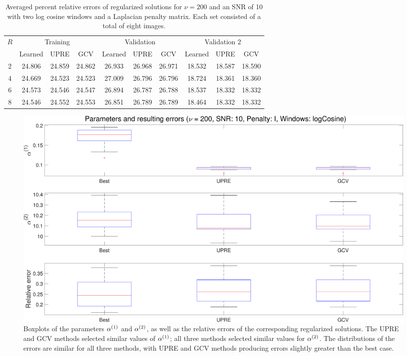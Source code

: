 \documentclass[12pt]{article}
\begin{document}
\begin{table}[ht!]
  \begin{center}
    \caption{Averaged percent relative errors of regularized solutions for $\nu = 200$ and an SNR of 10 with two log cosine windows and a Laplacian penalty matrix. Each set consisted of a total of eight images.}
    \label{tab:Relative Errors v200_SNR10_logCos2_L}
    \begin{tabular}{|c|c|c|c|c|c|c|c|c|c|}
    \hline
    \multirow{2}{*}{$R$} & \multicolumn{3}{|c|}{Training} & \multicolumn{3}{|c|}{Validation} & \multicolumn{3}{|c|}{Validation 2} \\
    \cline{2-10}
     & Learned & UPRE & GCV & Learned & UPRE & GCV & Learned & UPRE & GCV \\
    \hline
    2 & 24.806 & 24.859 & 24.862 & 26.933 & 26.968 & 26.971 & 18.532 & 18.587 & 18.590 \\
    \hline
    4 & 24.669 & 24.523 & 24.523 & 27.009 & 26.796 & 26.796 & 18.724 & 18.361 & 18.360\\
    \hline
    6 & 24.573 & 24.546 & 24.547 & 26.894 & 26.787 & 26.788 & 18.537 & 18.332 & 18.332 \\
    \hline
    8 & 24.546 & 24.552 & 24.553 & 26.851 & 26.789 & 26.789 & 18.464 & 18.332 & 18.332\\
    \hline
    \end{tabular}
  \end{center}
\end{table}


\begin{figure}[ht]
\centering
\includegraphics[width=1.0\textwidth]{Figures/Boxplot_v200_SNR10_logCos2_I.pdf}
\caption{Boxplots of the parameters $\alpha^{(1)}$ and $\alpha^{(2)}$, as well as the relative errors of the corresponding regularized solutions. The UPRE and GCV methods selected similar values of $\alpha^{(1)}$; all three methods selected similar values for $\alpha^{(2)}$. The distributions of the errors are similar for all three methods, with UPRE and GCV methods producing errors slightly greater than the best case.}
\label{fig:Boxplot_v200_SNR10_logCos2_I}
\end{figure}
\end{document}
